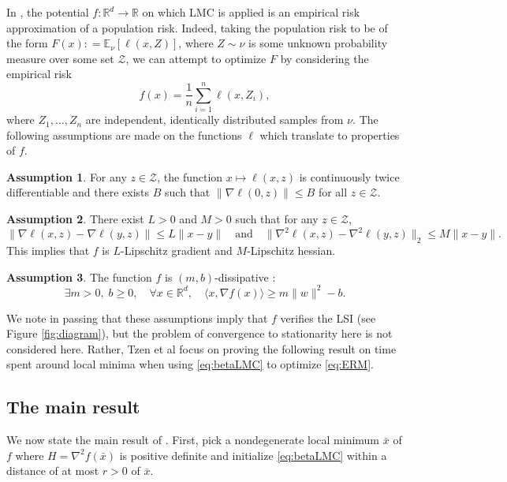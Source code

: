 \documentclass[11pt,twoside]{article}
\theoremstyle{definition}
\newtheorem{assumption}{Assumption}
\newcommand{\E}{\mathbb{E}}
\newcommand{\R}{\mathbb{R}}
\begin{document}
In \cite{tzen_local_2018}, the potential $f: \R^d \rightarrow \R$ on which LMC is applied is an empirical risk approximation of a population risk. Indeed, taking the population risk to be of the form
\(
F(x) : = \E_\nu [\ell(x, Z)]
\), where $Z \sim \nu$ is some unknown probability measure over some set $\mathcal{Z}$, we can attempt to optimize $F$ by considering the empirical risk
\begin{equation}
f(x) = \frac{1}{n} \sum_{i=1}^{n}\ell(x, Z_i),
\label{eq:ERM}
\end{equation}
where $Z_1, \dots, Z_n$ are independent, identically distributed samples from $\nu$. The following assumptions are made on the functions $\ell$ which translate to properties of $f$.
\begin{assumption}
  For any $z \in \mathcal{Z}$, the function $x \mapsto \ell(x, z)$ is continuously twice differentiable and there exists $B$ such that $\| \nabla \ell (0, z) \| \leq B$ for all $z \in \mathcal{Z}$.
\end{assumption}
\begin{assumption}
  There exist $L > 0$ and $M> 0$ such that for any $z \in \mathcal{Z}$,
  \[
  \| \nabla \ell(x, z) - \nabla \ell(y, z)\| \leq L \|x - y\| \quad \text{and} \quad \| \nabla^2 \ell(x, z) - \nabla^2 \ell(y, z)\|_2 \leq M \|x - y\|.
  \]
  This implies that $f$ is $L$-Lipschitz gradient and $M$-Lipschitz hessian.
\end{assumption}
\begin{assumption}
  The function $f$ is $(m, b)$-dissipative :
  \[
  \exists m>0, \; b\geq 0, \quad \forall x \in \R^d, \quad \langle x, \nabla f(x) \rangle \geq m \|w\|^2 - b.
  \]
  \label{ass:dissip}
\end{assumption}

We note in passing that these assumptions imply that $f$ verifies the LSI (see Figure \ref{fig:diagram}), but the problem of convergence to stationarity here is not considered here. Rather, Tzen et al focus on proving the following result on time spent around local minima when using \eqref{eq:betaLMC} to optimize \eqref{eq:ERM}.

\subsection{The main result}

We now state the main result of \cite{tzen_local_2018}. First, pick a nondegenerate local minimum $\bar{x}$ of $f$ where $H = \nabla^2f(\bar{x})$ is positive definite and initialize \eqref{eq:betaLMC} within a distance of at most $r > 0$ of $\bar{x}$. 
\end{document}
